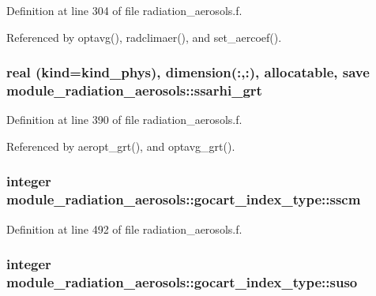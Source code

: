 Definition at line 304 of file radiation\+\_\+aerosols.\+f.



Referenced by optavg(), radclimaer(), and set\+\_\+aercoef().

\subsubsection[{\texorpdfstring{ssarhi\+\_\+grt}{ssarhi_grt}}]{\setlength{\rightskip}{0pt plus 5cm}real (kind=kind\+\_\+phys), dimension(\+:,\+:), allocatable, save module\+\_\+radiation\+\_\+aerosols\+::ssarhi\+\_\+grt\hspace{0.3cm}{\ttfamily [private]}}\hypertarget{group__module__radiation__aerosols_gae8587d9b4ebd9cf5d363a82d15049324}{}\label{group__module__radiation__aerosols_gae8587d9b4ebd9cf5d363a82d15049324}


Definition at line 390 of file radiation\+\_\+aerosols.\+f.



Referenced by aeropt\+\_\+grt(), and optavg\+\_\+grt().

\subsubsection[{\texorpdfstring{sscm}{sscm}}]{\setlength{\rightskip}{0pt plus 5cm}integer module\+\_\+radiation\+\_\+aerosols\+::gocart\+\_\+index\+\_\+type\+::sscm\hspace{0.3cm}{\ttfamily [private]}}\hypertarget{group__module__radiation__aerosols_ga814b63e33cdf9c3e1e470406056a9fcb}{}\label{group__module__radiation__aerosols_ga814b63e33cdf9c3e1e470406056a9fcb}


Definition at line 492 of file radiation\+\_\+aerosols.\+f.

\subsubsection[{\texorpdfstring{suso}{suso}}]{\setlength{\rightskip}{0pt plus 5cm}integer module\+\_\+radiation\+\_\+aerosols\+::gocart\+\_\+index\+\_\+type\+::suso\hspace{0.3cm}{\ttfamily [private]}}\hypertarget{group__module__radiation__aerosols_ga1556732edff9dba1d6593a1117af056f}{}\label{group__module__radiation__aerosols_ga1556732edff9dba1d6593a1117af056f}


